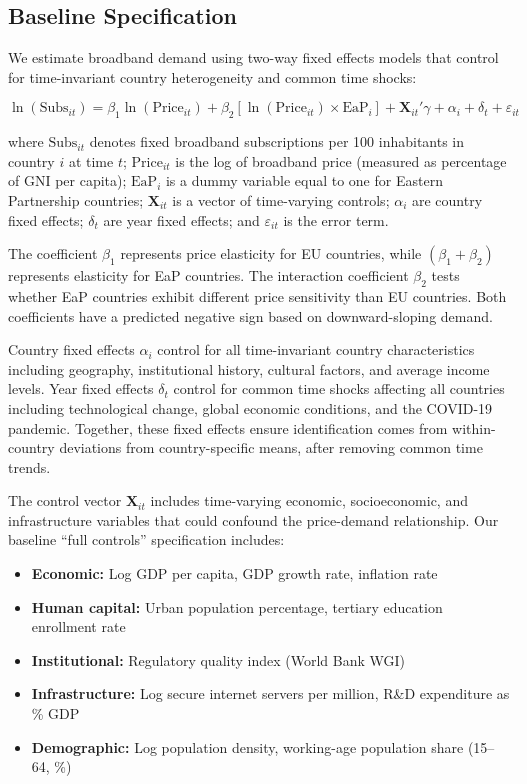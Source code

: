 \subsection{Baseline Specification}

We estimate broadband demand using two-way fixed effects models that control for time-invariant country heterogeneity and common time shocks:

\begin{equation}
\label{eq:baseline}
\ln(\text{Subs}_{it}) = \beta_1 \ln(\text{Price}_{it}) + \beta_2 [\ln(\text{Price}_{it}) \times \text{EaP}_i] + \mathbf{X}_{it}'\gamma + \alpha_i + \delta_t + \varepsilon_{it}
\end{equation}

where $\text{Subs}_{it}$ denotes fixed broadband subscriptions per 100 inhabitants in country $i$ at time $t$; $\text{Price}_{it}$ is the log of broadband price (measured as percentage of GNI per capita); $\text{EaP}_i$ is a dummy variable equal to one for Eastern Partnership countries; $\mathbf{X}_{it}$ is a vector of time-varying controls; $\alpha_i$ are country fixed effects; $\delta_t$ are year fixed effects; and $\varepsilon_{it}$ is the error term.

The coefficient $\beta_1$ represents price elasticity for EU countries, while $(\beta_1 + \beta_2)$ represents elasticity for EaP countries. The interaction coefficient $\beta_2$ tests whether EaP countries exhibit different price sensitivity than EU countries. Both coefficients have a predicted negative sign based on downward-sloping demand.

Country fixed effects $\alpha_i$ control for all time-invariant country characteristics including geography, institutional history, cultural factors, and average income levels. Year fixed effects $\delta_t$ control for common time shocks affecting all countries including technological change, global economic conditions, and the COVID-19 pandemic. Together, these fixed effects ensure identification comes from within-country deviations from country-specific means, after removing common time trends.

The control vector $\mathbf{X}_{it}$ includes time-varying economic, socioeconomic, and infrastructure variables that could confound the price-demand relationship. Our baseline ``full controls'' specification includes:

\begin{itemize}
    \item \textbf{Economic:} Log GDP per capita, GDP growth rate, inflation rate
    \item \textbf{Human capital:} Urban population percentage, tertiary education enrollment rate  
    \item \textbf{Institutional:} Regulatory quality index (World Bank WGI)
    \item \textbf{Infrastructure:} Log secure internet servers per million, R\&D expenditure as \% GDP
    \item \textbf{Demographic:} Log population density, working-age population share (15--64, \%)
\end{itemize}


